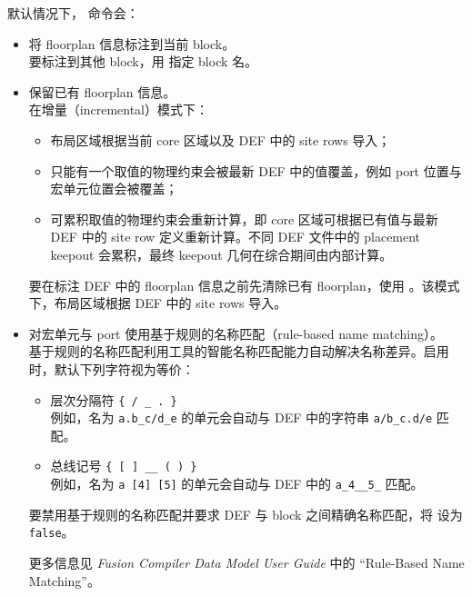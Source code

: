 默认情况下， 命令会：
\begin{itemize}
  \item 将 floorplan 信息标注到当前 block。\\
    要标注到其他 block，用  指定 block 名。
  \item 保留已有 floorplan 信息。\\
    在增量（incremental）模式下：
    \begin{itemize}
      \item 布局区域根据当前 core 区域以及 DEF 中的 site rows 导入；
      \item 只能有一个取值的物理约束会被最新 DEF 中的值覆盖，例如 port 位置与宏单元位置会被覆盖；
      \item 可累积取值的物理约束会重新计算，即 core 区域可根据已有值与最新 DEF 中的 site row 定义重新计算。不同 DEF 文件中的 placement keepout 会累积，最终 keepout 几何在综合期间由内部计算。
    \end{itemize}
    要在标注 DEF 中的 floorplan 信息之前先清除已有 floorplan，使用 。该模式下，布局区域根据 DEF 中的 site rows 导入。
  \item 对宏单元与 port 使用基于规则的名称匹配（rule-based name matching）。\\
    基于规则的名称匹配利用工具的智能名称匹配能力自动解决名称差异。启用时，默认下列字符视为等价：
    \begin{itemize}
      \item 层次分隔符 \texttt{\{ / \_ . \}}\\
        例如，名为 \texttt{a.b\_c/d\_e} 的单元会自动与 DEF 中的字符串 \texttt{a/b\_c.d/e} 匹配。
      \item 总线记号 \texttt{\{ [ ] \_\_ ( ) \}}\\
        例如，名为 \texttt{a [4] [5]} 的单元会自动与 DEF 中的 \texttt{a\_4\_\_5\_} 匹配。
    \end{itemize}
    要禁用基于规则的名称匹配并要求 DEF 与 block 之间精确名称匹配，将  设为 \texttt{false}。

\begin{seeAlsoBox}
更多信息见 \textit{Fusion Compiler Data Model User Guide} 中的 ``Rule-Based Name Matching''。
\end{seeAlsoBox}


\end{itemize}
